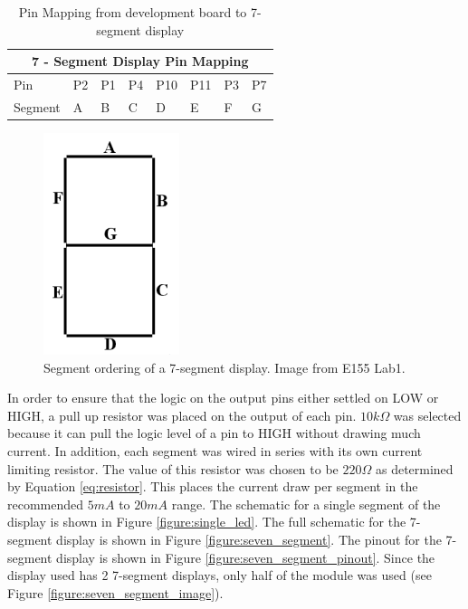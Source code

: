 \documentclass[11pt]{article}
\begin{document}
\begin{table}[h]
\center
\begin{tabular}{|l|l|l|l|l|l|l|l|}
\hline
\multicolumn{8}{|c|}{7 - Segment Display Pin Mapping} \\ \hline
Pin       & P2  & P1  & P4  & P10  & P11  & P3  & P7  \\ \hline
Segment   & A   & B   & C   & D    & E    & F   & G   \\ \hline
\end{tabular}
\caption{Pin Mapping from development board to 7-segment display}
\label{tb:pin_mapping}
\end{table}


\begin{figure}[h!]
\centering
\includegraphics[scale=0.6]{seven_segment_layout.png}
\caption{Segment ordering of a 7-segment display. Image from E155 Lab1.}
\label{figure:seven_segment_layout}
\end{figure} 


In order to ensure that the logic on the output pins either settled on LOW or HIGH, a pull up resistor was placed on the output of each pin. $10k\Omega$ was selected because it can pull the logic level of a pin to HIGH without drawing much current. In addition, each segment was wired in series with its own current limiting resistor. The value of this resistor was chosen to be $220\Omega$ as determined by Equation \ref{eq:resistor}. This places the current draw per segment in the recommended $5mA$ to $20mA$ range. The schematic for a single segment of the display is shown in Figure \ref{figure:single_led}. The full schematic for the 7-segment display is shown in Figure \ref{figure:seven_segment}. The pinout for the 7-segment display is shown in Figure \ref{figure:seven_segment_pinout}. Since the display used has 2 7-segment displays, only half of the module was used (see Figure \ref{figure:seven_segment_image}). 
\end{document}
